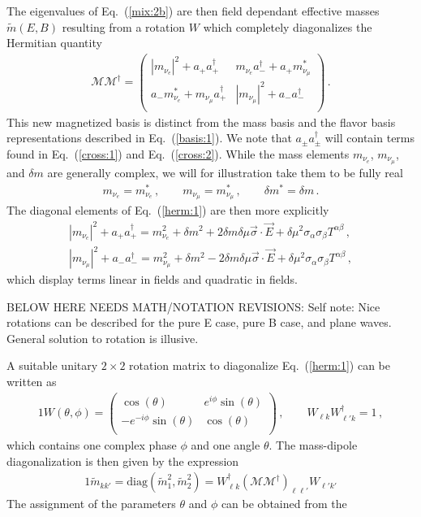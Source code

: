\documentclass[addchapnum]{ws-rv961x669} %
\newcommand{\req}[1]{Eq.~(\ref{#1})}
\begin{document}
The eigenvalues of \req{mix:2b} are then field dependant effective masses $\tilde{m}(E,B)$ resulting from a rotation $W$ which completely diagonalizes the Hermitian quantity 
\begin{align}
    \label{herm:1}
    \mathcal{M}\mathcal{M}^{\dag}=
    \begin{pmatrix}
        |m_{\nu_{e}}|^{2}+a_{+}a_{+}^{\dag} & m_{\nu_{e}}a_{-}^{\dag}+a_{+}m_{\nu_{\mu}}^{*}\\
        a_{-}m_{\nu_{e}}^{*}+m_{\nu_{\mu}}a_{+}^{\dag} & |m_{\nu_{\mu}}|^{2}+a_{-}a_{-}^{\dag}\\
    \end{pmatrix}\,.
\end{align}
This new magnetized basis is distinct from the mass basis and the flavor basis representations described in \req{basis:1}. We note that $a_{\pm}a_{\pm}^{\dag}$ will contain terms found in \req{cross:1} and \req{cross:2}. While the mass elements $m_{\nu_{e}}$, $m_{\nu_{\mu}}$, and ${\delta m}$ are generally complex, we will for illustration take them to be fully real
\begin{align}
    m_{\nu_{e}}=m_{\nu_{e}}^{*}\,,\qquad
    m_{\nu_{\mu}}=m_{\nu_{\mu}}^{*}\,,\qquad
    \delta m^{*}=\delta m\,.
\end{align}
The diagonal elements of \req{herm:1} are then more explicitly
\begin{align}
    \label{elements:1}
    |m_{\nu_{e}}|^{2}+a_{+}a_{+}^{\dag}=m_{\nu_{e}}^{2}+\delta m^{2}+2\delta m \delta\mu\vec{\sigma}\cdot\vec{E}+\delta\mu^{2}\sigma_{\alpha}\sigma_{\beta}T^{\alpha\beta}\,,\\
    |m_{\nu_{\mu}}|^{2}+a_{-}a_{-}^{\dag}=m_{\nu_{\mu}}^{2}+\delta m^{2}-2\delta m \delta\mu\vec{\sigma}\cdot\vec{E}+\delta\mu^{2}\sigma_{\alpha}\sigma_{\beta}T^{\alpha\beta}\,,
\end{align}
which display terms linear in fields and quadratic in fields.

BELOW HERE NEEDS MATH/NOTATION REVISIONS: Self note: Nice rotations can be described for the pure E case, pure B case, and plane waves. General solution to rotation is illusive.

A suitable unitary $2\times2$ rotation matrix to diagonalize \req{herm:1} can be written as
\begin{alignat}{1}
	\label{mix:4} W(\theta,\phi) = 
    \left(
    \begin{array}{cc}
         \cos (\theta ) & e^{i \phi } \sin (\theta ) \\
         -e^{-i \phi } \sin (\theta ) & \cos (\theta ) \\
    \end{array}
    \right)\,,\qquad
    W_{\ell k}W^{\dag}_{\ell' k} = 1\,,
\end{alignat}
which contains one complex phase $\phi$ and one angle $\theta$. The mass-dipole diagonalization is then given by the expression
\begin{alignat}{1}
	\label{mix:5} \tilde{m}_{kk'} = \mathrm{diag}(\tilde{m}_{1}^{2},\tilde{m}_{2}^{2})=W_{\ell k}^{\dag}\left(\mathcal{M}\mathcal{M}^{\dag}\right)_{\ell\ell'}W_{\ell'k'}
\end{alignat}
The assignment of the parameters $\theta$ and $\phi$ can be obtained from the
\end{document}
